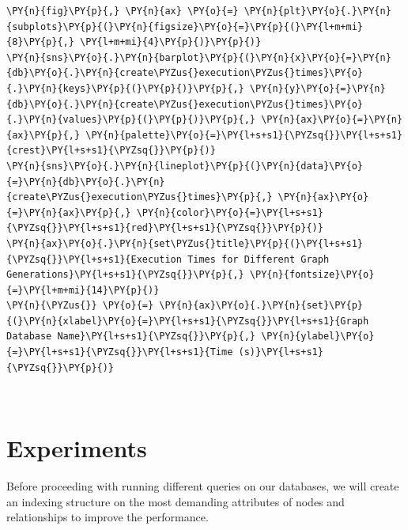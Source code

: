     \begin{tcolorbox}[breakable, size=fbox, boxrule=1pt, pad at break*=1mm,colback=cellbackground, colframe=cellborder]
\begin{Verbatim}[commandchars=\\\{\}]
\PY{n}{fig}\PY{p}{,} \PY{n}{ax} \PY{o}{=} \PY{n}{plt}\PY{o}{.}\PY{n}{subplots}\PY{p}{(}\PY{n}{figsize}\PY{o}{=}\PY{p}{(}\PY{l+m+mi}{8}\PY{p}{,} \PY{l+m+mi}{4}\PY{p}{)}\PY{p}{)}
\PY{n}{sns}\PY{o}{.}\PY{n}{barplot}\PY{p}{(}\PY{n}{x}\PY{o}{=}\PY{n}{db}\PY{o}{.}\PY{n}{create\PYZus{}execution\PYZus{}times}\PY{o}{.}\PY{n}{keys}\PY{p}{(}\PY{p}{)}\PY{p}{,} \PY{n}{y}\PY{o}{=}\PY{n}{db}\PY{o}{.}\PY{n}{create\PYZus{}execution\PYZus{}times}\PY{o}{.}\PY{n}{values}\PY{p}{(}\PY{p}{)}\PY{p}{,} \PY{n}{ax}\PY{o}{=}\PY{n}{ax}\PY{p}{,} \PY{n}{palette}\PY{o}{=}\PY{l+s+s1}{\PYZsq{}}\PY{l+s+s1}{crest}\PY{l+s+s1}{\PYZsq{}}\PY{p}{)}
\PY{n}{sns}\PY{o}{.}\PY{n}{lineplot}\PY{p}{(}\PY{n}{data}\PY{o}{=}\PY{n}{db}\PY{o}{.}\PY{n}{create\PYZus{}execution\PYZus{}times}\PY{p}{,} \PY{n}{ax}\PY{o}{=}\PY{n}{ax}\PY{p}{,} \PY{n}{color}\PY{o}{=}\PY{l+s+s1}{\PYZsq{}}\PY{l+s+s1}{red}\PY{l+s+s1}{\PYZsq{}}\PY{p}{)}
\PY{n}{ax}\PY{o}{.}\PY{n}{set\PYZus{}title}\PY{p}{(}\PY{l+s+s1}{\PYZsq{}}\PY{l+s+s1}{Execution Times for Different Graph Generations}\PY{l+s+s1}{\PYZsq{}}\PY{p}{,} \PY{n}{fontsize}\PY{o}{=}\PY{l+m+mi}{14}\PY{p}{)}
\PY{n}{\PYZus{}} \PY{o}{=} \PY{n}{ax}\PY{o}{.}\PY{n}{set}\PY{p}{(}\PY{n}{xlabel}\PY{o}{=}\PY{l+s+s1}{\PYZsq{}}\PY{l+s+s1}{Graph Database Name}\PY{l+s+s1}{\PYZsq{}}\PY{p}{,} \PY{n}{ylabel}\PY{o}{=}\PY{l+s+s1}{\PYZsq{}}\PY{l+s+s1}{Time (s)}\PY{l+s+s1}{\PYZsq{}}\PY{p}{)}
\end{Verbatim}
\end{tcolorbox}

    \begin{center}
    \end{center}
    { \hspace*{\fill} \\}
    
    \hypertarget{experiments}{%
\section{Experiments}\label{experiments}}

    Before proceeding with running different queries on our databases, we
will create an indexing structure on the most demanding attributes of
nodes and relationships to improve the performance.

